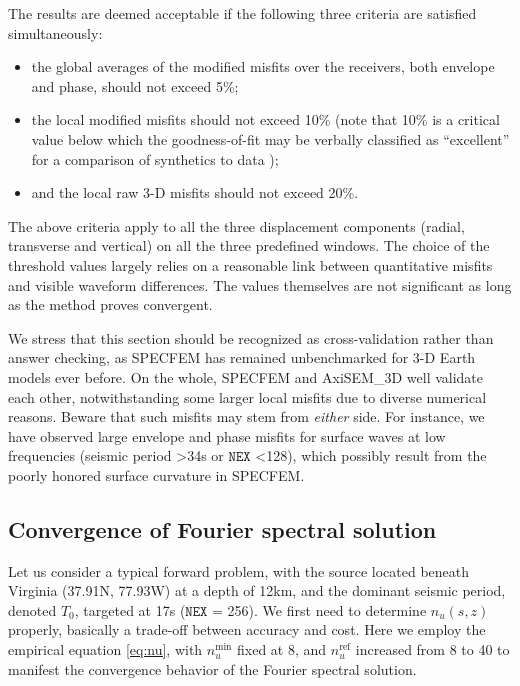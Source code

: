 \documentclass[extra]{gji}
\begin{document}
The results are deemed acceptable if the following three criteria are 
satisfied simultaneously: 
\begin{itemize}
  \item the global averages of the modified misfits over the receivers, 
  both envelope and phase, should not exceed 5\%;
  \item the local modified misfits should not exceed 10\% 
  (note that 10\% is a critical value below which the goodness-of-fit may be 
  verbally classified as ``excellent'' for a comparison of synthetics to data
  \cite[]{kristekova2009time, anderson2004quantitative});
  \item and the local raw 3-D misfits should not exceed 20\%.  
\end{itemize}
The above criteria apply to all the three displacement components 
(radial, transverse and vertical) on all the three predefined windows.
The choice of the threshold values largely relies on a reasonable  
link between quantitative misfits and visible waveform differences. 
The values themselves are not significant as long as the method proves convergent. 

We stress that this section should be recognized as cross-validation 
rather than answer checking, as SPECFEM has remained unbenchmarked 
for 3-D Earth models ever before. 
On the whole, SPECFEM and AxiSEM\_3D well validate each other, 
notwithstanding some larger local misfits due to diverse numerical reasons. 
Beware that such misfits may stem from \textit{either} side.
For instance, we have observed large envelope and phase misfits
for surface waves at low frequencies 
(seismic period \textgreater 34s or $\mathtt{NEX}$ \textless 128), 
which possibly result from the poorly honored surface curvature in SPECFEM.

\subsection{Convergence of Fourier spectral solution}
\label{sec:benconv}
Let us consider a typical forward problem, with the source located
beneath Virginia (37.91\degr N, 77.93\degr W) at a depth of 12km, and the 
dominant seismic period, denoted $T_0$, targeted at 17s ($\mathtt{NEX}$ = 256).  
We first need to determine 
$n_u\left(s,z\right)$ properly, basically a trade-off between accuracy and cost.  
Here we employ the empirical equation \eqref{eq:nu},
with $n_u^\text{min}$ fixed at 8, and $n_u^\text{ref}$ increased 
from 8 to 40 to manifest the convergence behavior of the 
Fourier spectral solution.
\end{document}
